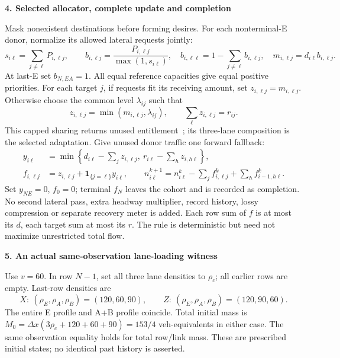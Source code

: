 \documentclass[10pt,a4paper]{article}
\newcommand{\head}[1]{\par\medskip\textbf{#1}\par}
\begin{document}
\head{4. Selected allocator, complete update and completion}
Mask nonexistent destinations before forming desires. For each nonterminal-E
donor, normalize its allowed lateral requests jointly:
\begin{equation}
 s_{i\ell}=\sum_{j\ne\ell}P_{i,\ell j},\qquad
 b_{i,\ell j}=\frac{P_{i,\ell j}}{\max(1,s_{i\ell})},\quad
 b_{i,\ell\ell}=1-\sum_{j\ne\ell}b_{i,\ell j},\quad
 m_{i,\ell j}=d_{i\ell}b_{i,\ell j}. \label{eq:request}
\end{equation}
At last-E set $b_{N,EA}=1$. All equal reference capacities give equal positive
priorities. For each target $j$, if requests fit its receiving amount, set
$z_{i,\ell j}=m_{i,\ell j}$. Otherwise choose the common level $\lambda_{ij}$
such that
\begin{equation}
 z_{i,\ell j}=\min(m_{i,\ell j},\lambda_{ij}),\qquad
 \sum_\ell z_{i,\ell j}=r_{ij}. \label{eq:allocate}
\end{equation}
This capped sharing returns unused entitlement~\cite{carey,wright}; its
three-lane composition is the selected adaptation. Give unused donor traffic
one forward fallback:
\begin{align}
 y_{i\ell}&=\min\left\{d_{i\ell}-\sum_jz_{i,\ell j},\ 
                r_{i\ell}-\sum_hz_{i,h\ell}\right\},\nonumber\\
 f_{i,\ell j}&=z_{i,\ell j}+\mathbf1_{\{j=\ell\}}y_{i\ell},\qquad
 n^{k+1}_{i\ell}=n^k_{i\ell}-\sum_jf^k_{i,\ell j}+\sum_hf^k_{i-1,h\ell}.
 \label{eq:update}
\end{align}
Set $y_{NE}=0$, $f_0=0$; terminal $f_N$ leaves the cohort and is recorded as
completion. No second lateral pass, extra headway multiplier, record history,
lossy compression or separate recovery meter is added. Each row sum of $f$
is at most its $d$, each target sum at most its $r$. The rule is deterministic
but need not maximize unrestricted total flow.

\newpage
\head{5. An actual same-observation lane-loading witness}
Use $v=60$. In row $N-1$, set all three lane densities to $\rho_c$; all
earlier rows are empty. Last-row densities are
\begin{equation}
 X:\ (\rho_E,\rho_A,\rho_B)=(120,60,90),\qquad
 Z:\ (\rho_E,\rho_A,\rho_B)=(120,90,60). \label{eq:states}
\end{equation}
The entire E profile and A+B profile coincide. Total initial mass is
$M_0=\Delta x(3\rho_c+120+60+90)=153/4$ veh-equivalents in either case.
The same observation equality holds for total row/link mass. These are
prescribed initial states; no identical past history is asserted.
\end{document}
